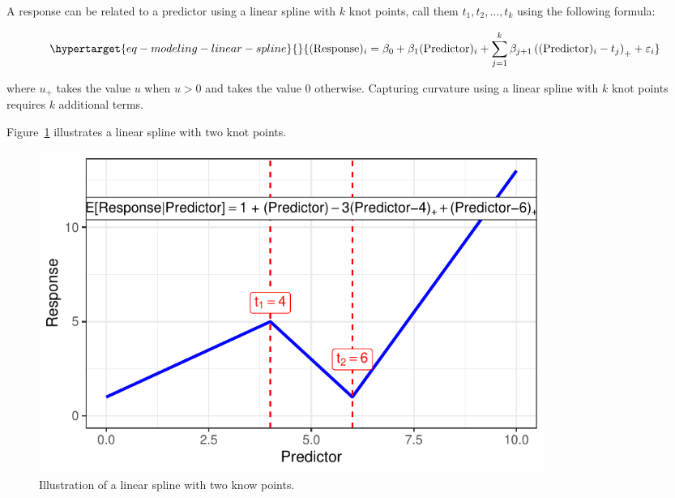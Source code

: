 \documentclass[
  letterpaper,
  DIV=11,
  numbers=noendperiod]{scrreprt}
\theoremstyle{definition}
\theoremstyle{definition}
\theoremstyle{remark}
\begin{document}
\begin{tcolorbox}[enhanced jigsaw, left=2mm, toprule=.15mm, arc=.35mm, breakable, opacitybacktitle=0.6, opacityback=0, rightrule=.15mm, colbacktitle=quarto-callout-note-color!10!white, coltitle=black, leftrule=.75mm, toptitle=1mm, colframe=quarto-callout-note-color-frame, titlerule=0mm, title=\textcolor{quarto-callout-note-color}{\faInfo}\hspace{0.5em}{Formula for Linear Spline}, bottomrule=.15mm, colback=white, bottomtitle=1mm]

A response can be related to a predictor using a linear spline with
\(k\) knot points, call them \(t_1, t_2, \dotsc, t_k\) using the
following formula:

\begin{equation}\protect\hypertarget{eq-modeling-linear-spline}{}{(\text{Response})_i = \beta_0 + \beta_1 (\text{Predictor})_i + \sum_{j=1}^{k} \beta_{j+1} \left((\text{Predictor})_i - t_j\right)_{+} + \varepsilon_i}\label{eq-modeling-linear-spline}\end{equation}

where \(u_{+}\) takes the value \(u\) when \(u > 0\) and takes the value
0 otherwise. Capturing curvature using a linear spline with \(k\) knot
points requires \(k\) additional terms.

\end{tcolorbox}

Figure~\ref{fig-modeling-splines-linear-spline} illustrates a linear
spline with two knot points.

\begin{figure}

{\centering \includegraphics[width=0.8\textwidth,height=\textheight]{./images/fig-modeling-splines-linear-spline-1.pdf}

}

\caption{\label{fig-modeling-splines-linear-spline}Illustration of a
linear spline with two know points.}

\end{figure}
\end{document}
